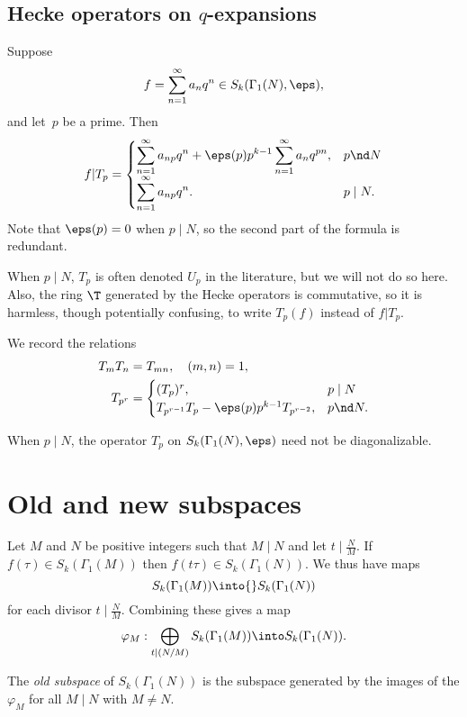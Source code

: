 \documentclass{report}
\begin{document}
\subsection{Hecke operators on $q$-expansions}\label{sec:heckeqN}
Suppose
\[
  f=\sum_{n=1}^{\infty}a_n q^n \in S_k(\Gamma_1(N),\eps),
\]
and let~$p$ be a prime.
Then
\[
f|T_p = \begin{cases}
\displaystyle
\sum_{n=1}^{\infty} a_{np}q^n + \eps(p)p^{k-1}
                   \sum_{n=1}^{\infty} a_n{}q^{pn},  &p\nd N\\
\displaystyle
\sum_{n=1}^{\infty} a_{np}q^n. &p\mid N.
\end{cases}
\]
Note that $\eps(p)=0$ when $p\mid N$, so the second part of the formula
is redundant.

When $p\mid{}N$, $T_p$ is often denoted $U_p$ in the literature,
but we will not do so here. Also, the ring $\T$ generated by the
Hecke operators is commutative, so it is harmless, though
potentially confusing, to write $T_p(f)$ instead of $f|T_p$.

We record the relations
\begin{align*}
T_mT_n&=T_{mn},\quad (m,n)=1,\\%
 T_{p^r}&=\begin{cases}
   (T_p)^r, & p\mid N\\
   T_{p^{r-1}}T_p - \eps(p)p^{k-1}T_{p^{r-2}}, & p\nd N.
\end{cases}
\end{align*}

 When $p\mid N$, the operator $T_p$ on
$S_k(\Gamma_1(N),\eps)$ need not be diagonalizable.


\section{Old and new subspaces}
Let $M$ and $N$ be positive integers such that $M\mid{}N$ and let
$t\mid{}\frac{N}{M}$. If $f(\tau)\in S_k(\Gamma_1(M))$ then
$f(t\tau)\in{}S_k(\Gamma_1(N))$. We thus have maps
\[
  S_k(\Gamma_1(M))\into{}S_k(\Gamma_1(N))
\]
for each divisor $t\mid \frac{N}{M}$. Combining these gives a map
\[
  \varphi_M:\bigoplus_{t\mid (N/M)}
     S_k(\Gamma_1(M))\into S_k(\Gamma_1(N)).
\]

\begin{definition} The {\em old subspace} of $S_k(\Gamma_1(N))$ is the subspace
generated by the images of the $\varphi_M$ for all $M\mid N$ with $M\neq N$.
\end{definition}
\end{document}
